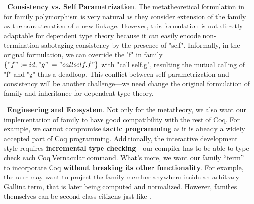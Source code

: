 ~\textbf{Consistency vs. Self Parametrization}. The metatheoretical formulation in~\citet{zm2017} for family polymorphism is very natural as they consider extension of the family as the concatenation of a new linkage. However, this formulation is not directly adaptable for dependent type theory because it can easily encode non-termination sabotaging consistency by the presence of "self". Informally, in the orignal formulation, we can override the "f" in family $\{"f" := id; "g" := "call self.f"\}$ with "call self.g", resulting the mutual calling of "f" and "g" thus a deadloop. This conflict between self parametrization and consistency will be another challenge---we need change the original formulation of family and inheritance for dependent type theory.


~\textbf{Engineering and Ecosystem}.  Not only for the metatheory, we also want our implementation of family to have good compatibility with the rest of Coq. For example, we cannot compromise \textbf{tactic programming} as it is already a widely accepted part of Coq programming. Additionally, the interactive development style requires \textbf{incremental type checking}---our compiler has to be able to type check each Coq Vernacular command. What's more, we want our family ``term'' to incorporate Coq \textbf{without breaking its other functionality}. For example, the user may want to project the family member anywhere inside an arbitrary Gallina term, that is later being computed and normalized. However, families themselves can be second class citizens just like \citet{zm2017}.




